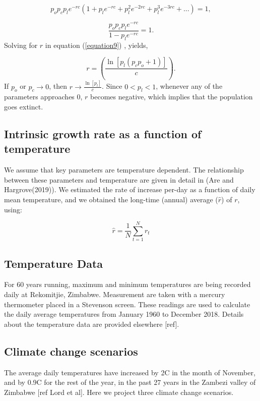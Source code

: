 \documentclass[10pt,a4paper]{article}
\begin{document}
$$p_op_cp_le^{-rc} (1 + p_le^{-rc} + p_l^2e^{-2rc} + p_l^3e^{-3rc}+ ...) =1,$$

\begin{equation}
\label{equation9} 
\frac{p_op_cp_le^{-rc}}{1-p_le^{-rc}} =1.
\end{equation}
Solving for $r$ in equation (\ref{equation9}) , yields, 

\begin{equation}
\label{equation13} 
r = (\frac{\ln[p_l(p_cp_o+1)]}{c}).
\end{equation}
If  $p_o$ or $p_c \rightarrow{0}$, then  $r \rightarrow{\frac{\ln[p_l]}{c}}$. Since $0 < p_l < 1$, whenever any of the parameters approaches $0$, $r$ becomes negative, which implies that the population goes extinct. 


\subsection*{Intrinsic growth rate as a function of temperature}

We assume that key parameters are temperature dependent. The relationship between these parameters and temperature are given in detail in (Are and Hargrove(2019)). We estimated the rate of increase per-day as a function of daily mean temperature, and we obtained the long-time (annual) average ($\hat{r}$)  of $r$, using: 

\begin{equation}
\label{equation1010} 
\hat{r} = \frac{1}{N} \sum_{t=1}^{N} r_t
\end{equation}

\subsection*{Temperature Data}
For 60 years running, maximum and minimum temperatures are being recorded daily at Rekomitjie, Zimbabwe. Measurement are taken with a mercury thermometer placed in a Stevenson screen.  These readings are used to calculate the daily average temperatures from January 1960 to December 2018. Details about the temperature data are provided elsewhere [ref].   

\subsection*{Climate change scenarios}

The average daily temperatures have increased by 2\degree C in the month of November, and by 0.9\degree C for the rest of the year, in the past 27 years in the Zambezi valley of Zimbabwe [ref Lord et al]. Here we project three climate change scenarios.
\end{document}
